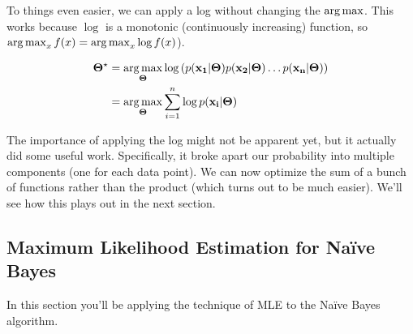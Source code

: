 \documentclass[assignment03_Solutions]{subfiles}
\begin{document}
To things even easier, we can apply a log without changing the $\operatorname*{arg\,max}$.  This works because $\log$ is a monotonic (continuously increasing) function, so $\operatorname*{arg\,max}_x f(x) = \operatorname*{arg\,max}_x \log  f(x) $).


\begin{align}
\mathbf{\Theta^\star} &= \operatorname*{arg\,max}_{\mathbf{\Theta}} \log \left ( p(\mathbf{x_1} |  \mathbf{\Theta}) p(\mathbf{x_2} | \mathbf{\Theta}) \ldots p(\mathbf{x_n} | \mathbf{\Theta})  \right) \nonumber \\
&=  \operatorname*{arg\,max}_{\mathbf{\Theta}} \sum_{i=1}^n \log p(\mathbf{x_i} |  \mathbf{\Theta})  \label{eq:mleiidlog}
\end{align}

The importance of applying the log might not be apparent yet, but it actually did some useful work.  Specifically, it broke apart our probability into multiple components (one for each data point).  We can now optimize the sum of a bunch of functions rather than the product (which turns out to be much easier).  We'll see how this plays out in the next section.

\subsection{Maximum Likelihood Estimation for Na\"ive Bayes}

In this section you'll be applying the technique of MLE to the Na\"ive Bayes algorithm.
\end{document}
